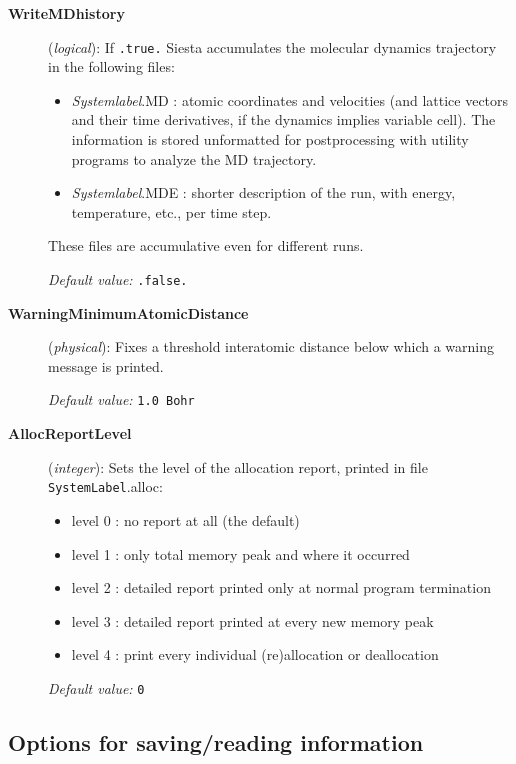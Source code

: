 \documentclass[11pt]{article}
\begin{document}
\begin{description}
 
\item[{\bf WriteMDhistory}] ({\it logical}):
If {\tt .true.} {\sc Siesta} accumulates the molecular dynamics
trajectory in the following files:
\begin{itemize}
\item
{\it Systemlabel}.MD : atomic coordinates and velocities (and
lattice vectors and their time derivatives, if the dynamics implies
variable cell). The information is stored unformatted for postprocessing
with utility programs to analyze the MD trajectory. 
\item
{\it Systemlabel}.MDE : shorter description of the run, with energy,
temperature, etc., per time step.
\end{itemize}
These files are accumulative even for different runs.
 
{\it Default value:} {\tt .false.}


\item[{\bf WarningMinimumAtomicDistance}] ({\it physical}): 
Fixes a threshold interatomic distance below which a warning
message is printed.

{\it Default value:} {\tt 1.0 Bohr}

        
\item[{\bf AllocReportLevel}] ({\it integer}): 
Sets the level of the allocation report, printed in file 
{\tt SystemLabel}.alloc:
\begin{itemize}
\item
  level 0 : no report at all (the default)
\item
  level 1 : only total memory peak and where it occurred
\item
  level 2 : detailed report printed only at 
            normal program termination
\item
  level 3 : detailed report printed at every new memory peak
\item
  level 4 : print every individual (re)allocation or deallocation
\end{itemize}

{\it Default value:} {\tt 0}

        
\end{description}



\vspace{5pt}
\subsection{Options for saving/reading information}
\end{document}
